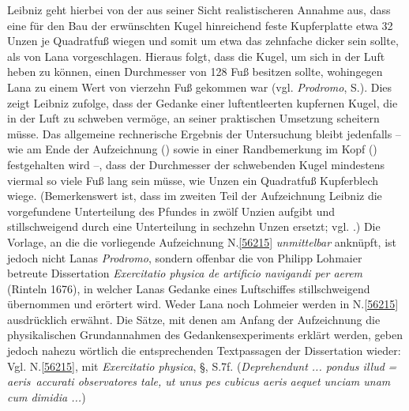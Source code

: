 Leibniz geht hierbei von der aus seiner Sicht realistischeren Annahme aus, dass eine für den Bau der erwünschten Kugel hinreichend feste Kupferplatte etwa 32 Unzen je Quadratfuß wiegen und somit um etwa das zehnfache dicker sein sollte, als von Lana vorgeschlagen.
Hieraus folgt, dass die Kugel, um sich in der Luft heben zu können, einen Durchmesser von 128 Fuß besitzen sollte, wohingegen Lana zu einem Wert von vierzehn Fuß gekommen war (vgl. \textit{Prodromo},\cite{00069} S.).
Dies zeigt Leibniz zufolge, dass der Gedanke einer luftentleerten kupfernen Kugel, die in der Luft zu schweben vermöge, an seiner praktischen Umsetzung scheitern müsse.
Das allgemeine rechnerische Ergebnis der Untersuchung bleibt jedenfalls -- wie am Ende der Aufzeichnung () sowie in einer Randbemerkung im Kopf () festgehalten wird --, dass der Durchmesser der schwebenden Kugel mindestens viermal so viele Fuß lang sein müsse, wie Unzen ein Quadratfuß Kupferblech wiege.
(Bemerkenswert ist, dass im zweiten Teil der Aufzeichnung %
Leibniz die vorgefundene Unterteilung des Pfundes in zwölf Unzien aufgibt und stillschweigend durch eine Unterteilung in sechzehn Unzen ersetzt; vgl. .)
\pend%
\pstart%
Die Vorlage, an die die vorliegende Aufzeichnung N.\;\ref{56215} \textit{unmittelbar} anknüpft, ist jedoch nicht Lanas \textit{Prodromo}\cite{00069}, sondern offenbar die von Philipp Lohmaier betreute Dissertation \textit{Exercitatio physica de artificio navigandi per aerem} (Rinteln 1676),\cite{01422} in welcher Lanas Gedanke eines Luftschiffes stillschweigend übernommen und erörtert wird.
Weder Lana noch Lohmeier werden in N.\;\ref{56215} ausdrücklich erwähnt.
Die Sätze, mit denen am Anfang der Aufzeichnung die physikalischen Grundannahmen des Gedankensexperiments erklärt werden, geben jedoch nahezu wörtlich die entsprechenden Textpassagen der Dissertation wieder:
Vgl. N.\;\ref{56215},  mit \textit{Exercitatio physica},\cite{01422} §, S.\;7f. (\textit{Deprehendunt ... pondus illud} \lbrack\textit{= aeris}\rbrack\ \textit{accurati observatores tale, ut unus pes cubicus aeris aequet unciam unam cum dimidia ...})
